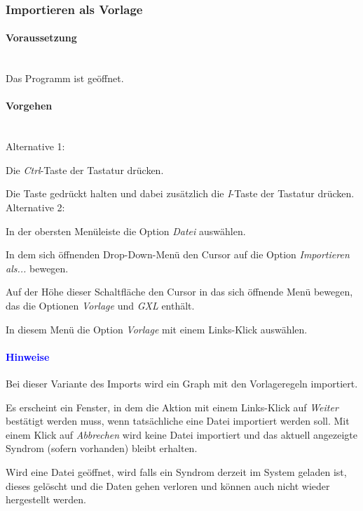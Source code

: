 \documentclass[enabledeprecatedfontcommands,fontsize=11pt,paper=a4,twoside]{scrartcl}
\newcounter{one}
\newcounter{two}[one]
\newcommand*{\hint}{\paragraph{\textcolor{blue}{Hinweise}}}
\newcommand*{\condition}{\paragraph{Voraussetzung}$\;$ \vspace{0.2cm}\\}
\newcommand*{\actions}{\paragraph{Vorgehen} $\;$\vspace{0.2cm}\\}
\newcommand*{\aOne}{\textcolor{bbe}{Alternative 1:}}
\newcommand*{\aTwo}{\textcolor{bbe}{Alternative 2:}}
\let\tempone\itemize
\let\temptwo\enditemize
\renewenvironment{itemize}{\tempone\addtolength{\itemsep}{-10.0pt}}{\temptwo}
\let\origenumerate\enumerate
\let\origendenumerate\endenumerate
\renewenvironment{enumerate}{\origenumerate \addtolength{\itemsep}{-10.0pt}}{\origendenumerate}
\begin{document}
\subsubsection{Importieren als  Vorlage}
		\condition 	
		Das Programm ist geöffnet.
		\actions
		\aOne
		\begin{enumerate}
				\item Die \textit{Ctrl}-Taste der Tastatur drücken.
				\item Die Taste gedrückt halten und dabei zusätzlich die \textit{I}-Taste der Tastatur drücken.
		\end{enumerate}				
		\aTwo
		\begin{enumerate}
				\item In der obersten Menüleiste die Option \textit{Datei} auswählen. 
				\item In dem sich öffnenden Drop-Down-Menü den Cursor auf die Option \textit{Importieren als...} bewegen.
				\item Auf der Höhe dieser Schaltfläche den Cursor in das sich öffnende Menü bewegen, das die Optionen \textit{Vorlage} und \textit{GXL} enthält.
				\item In diesem Menü die Option \textit{Vorlage} mit einem Links-Klick auswählen.
		\end{enumerate}		
		\hint
		\begin{itemize}
				\item Bei dieser Variante des Imports wird ein Graph mit den Vorlageregeln importiert.
				\item Es erscheint ein Fenster, in dem die Aktion mit einem Links-Klick auf \textit{Weiter} bestätigt werden muss, wenn tatsächliche eine Datei importiert werden soll. Mit einem Klick auf \textit{Abbrechen} wird keine Datei importiert und das aktuell angezeigte Syndrom (sofern vorhanden) bleibt erhalten.
				\item  Wird eine Datei geöffnet, wird falls ein Syndrom derzeit im System geladen ist, dieses gelöscht und die Daten gehen verloren und können auch nicht wieder hergestellt werden. \\ 
		\end{itemize}

\end{document}

